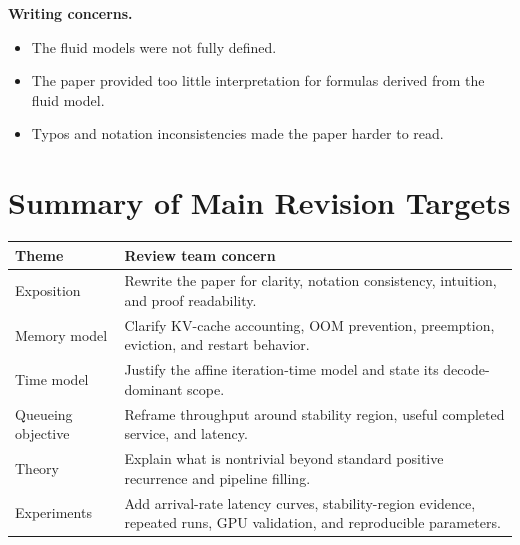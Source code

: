 \documentclass[11pt]{article}
\begin{document}
\textbf{Writing concerns.}
\begin{itemize}
    \item The fluid models were not fully defined.
    \item The paper provided too little interpretation for formulas derived from the fluid model.
    \item Typos and notation inconsistencies made the paper harder to read.
\end{itemize}

\section*{Summary of Main Revision Targets}

\begin{center}
\small
\begin{tabular}{@{}p{}p{}@{}}
\toprule
\textbf{Theme} & \textbf{Review team concern} \\
\midrule
Exposition & Rewrite the paper for clarity, notation consistency, intuition, and proof readability. \\
Memory model & Clarify KV-cache accounting, OOM prevention, preemption, eviction, and restart behavior. \\
Time model & Justify the affine iteration-time model and state its decode-dominant scope. \\
Queueing objective & Reframe throughput around stability region, useful completed service, and latency. \\
Theory & Explain what is nontrivial beyond standard positive recurrence and pipeline filling. \\
Experiments & Add arrival-rate latency curves, stability-region evidence, repeated runs, GPU validation, and reproducible parameters. \\
\bottomrule
\end{tabular}
\end{center}
\end{document}
